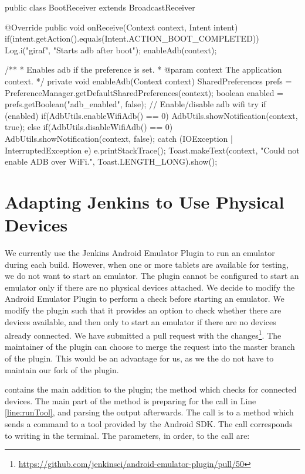 \begin{javacode}[float,label=lst:android_app_broadcast_receiver,caption=Android boot broadcast receiver]
public class BootReceiver extends BroadcastReceiver {
  @Override
  public void onReceive(Context context, Intent intent) {
    if(intent.getAction().equals(Intent.ACTION_BOOT_COMPLETED)) {
      Log.i("giraf", "Starts adb after boot");
      enableAdb(context);
    }
  }


  /**
  * Enables adb if the preference is set.
  * @param context The application context.
  */
  private void enableAdb(Context context) {
    SharedPreferences prefs = PreferenceManager.getDefaultSharedPreferences(context);
    boolean enabled = prefs.getBoolean("adb_enabled", false);
    // Enable/disable adb wifi
    try {
      if (enabled) {
        if(AdbUtils.enableWifiAdb() == 0) {
          AdbUtils.showNotification(context, true);
        }
      } else {
        if(AdbUtils.disableWifiAdb() == 0) {
          AdbUtils.showNotification(context, false);
        }
      }
    } catch (IOException | InterruptedException e) {
      e.printStackTrace();
      Toast.makeText(context, "Could not enable ADB over WiFi.", Toast.LENGTH_LONG).show();
    }
  }
}
\end{javacode}

\section{Adapting Jenkins to Use Physical Devices}
We currently use the Jenkins Android Emulator Plugin to run an emulator during each build. However, when one or more tablets are available for testing, we do not want to start an emulator. The plugin cannot be configured to start an emulator only if there are no physical devices attached. We decide to modify the Android Emulator Plugin to perform a check before starting an emulator. We modify the plugin such that it provides an option to check whether there are devices available, and then only to start an emulator if there are no devices already connected. We have submitted a pull request with the changes\footnote{\url{https://github.com/jenkinsci/android-emulator-plugin/pull/50}}. The maintainer of the plugin can choose to merge the request into the master branch of the plugin. This would be an advantage for us, as we the do not have to maintain our fork of the plugin.

 contains the main addition to the plugin; the method which checks for connected devices. The main part of the method is preparing for the call in Line \ref{line:runTool}, and parsing the output afterwards. The call is to a method which sends a command to a tool provided by the Android SDK. The call corresponds to writing  in the terminal. The parameters, in order, to the call are:

